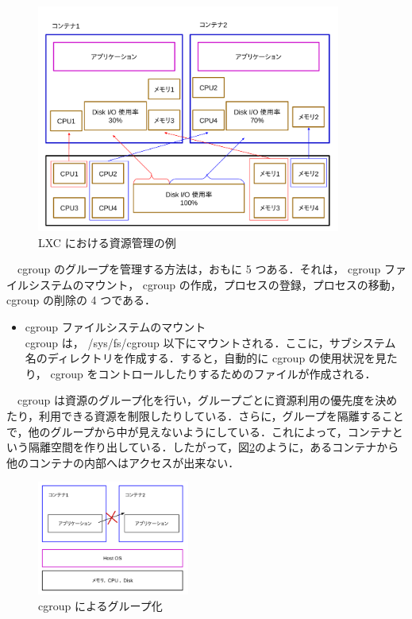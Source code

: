 \documentclass[graduation-thesis]{jsarticle}
\begin{document}
\begin{figure}[H]
	\begin{center}
		\includegraphics[width=10.0cm, clip]{images/container.pdf}
		\caption{LXC における資源管理の例}
		\label{fig:grouping}
	\end{center}
\end{figure}
　cgroup のグループを管理する方法は，おもに 5 つある．それは， cgroup ファイルシステムのマウント， cgroup の作成，プロセスの登録，プロセスの移動， cgroup の削除の 4 つである．
\begin{itemize}
	\item{cgroup ファイルシステムのマウント}\\
	cgroup は， /sys/fs/cgroup 以下にマウントされる．ここに，サブシステム名のディレクトリを作成する．すると，自動的に cgroup の使用状況を見たり， cgroup をコントロールしたりするためのファイルが作成される．
\end{itemize}
%
%
　cgroup は資源のグループ化を行い，グループごとに資源利用の優先度を決めたり，利用できる資源を制限したりしている．さらに，グループを隔離することで，他のグループから中が見えないようにしている．これによって，コンテナという隔離空間を作り出している．したがって，図\ref{fig:grouping}のように，あるコンテナから他のコンテナの内部へはアクセスが出来ない．\\
\begin{figure}[H]
	\begin{center}
		\includegraphics[width=5.0cm, clip]{images/kakuri.pdf}
		\caption{cgroup によるグループ化}
		\label{fig:grouping}
	\end{center}
\end{figure}
\end{document}
